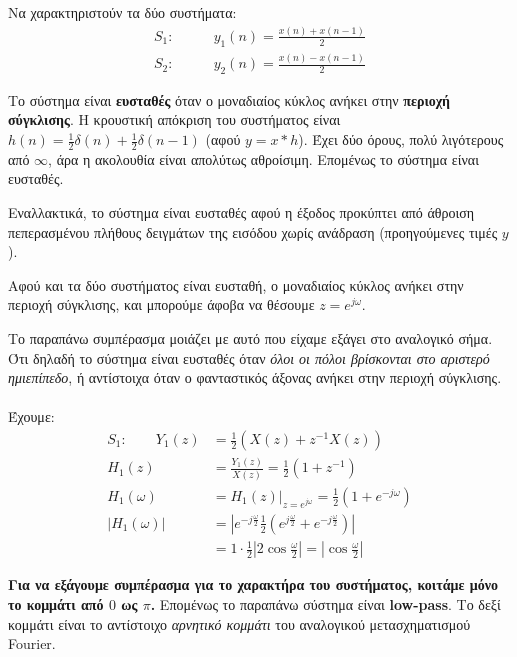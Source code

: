 \documentclass[11pt,a4paper,notitlepage,fleqn]{article}
\let\mytodo\todo
\renewcommand{\todo}[1]{\par\mytodo[inline,noline]{#1}}
\begin{document}
\begin{exercise}
	Να χαρακτηριστούν τα δύο συστήματα:
	\begin{align*}
		S_1: \qquad & y_1(n) = \frac{x(n) + x(n-1)}{2}\\
		S_2: \qquad & y_2(n) = \frac{x(n) - x(n-1)}{2}
	\end{align*}
	
	\tcblower
	Το σύστημα είναι \textbf{ευσταθές} όταν ο μοναδιαίος κύκλος ανήκει στην \textbf{περιοχή σύγκλισης}. Η κρουστική απόκριση
	του συστήματος είναι \( h(n) = \frac{1}{2}δ(n) + \frac{1}{2}δ(n-1) \) (αφού \( y=x*h \)). Έχει δύο
	όρους, πολύ λιγότερους από \( \infty \), άρα η ακολουθία είναι απολύτως αθροίσιμη. Επομένως το σύστημα είναι ευσταθές.
	
	Εναλλακτικά, το σύστημα είναι ευσταθές αφού η έξοδος προκύπτει από άθροιση πεπερασμένου πλήθους δειγμάτων της εισόδου χωρίς ανάδραση (προηγούμενες τιμές \( y \)).
	
	Αφού και τα δύο συστήματος είναι ευσταθή, ο μοναδιαίος κύκλος ανήκει στην περιοχή σύγκλισης, και
	μπορούμε άφοβα να θέσουμε \( z=e^{j\omega } \).
	
	Το παραπάνω συμπέρασμα μοιάζει με αυτό που είχαμε εξάγει στο αναλογικό σήμα. Ότι δηλαδή το σύστημα
	είναι ευσταθές όταν \emph{όλοι οι πόλοι βρίσκονται στο αριστερό ημιεπίπεδο}, ή αντίστοιχα όταν ο
	φανταστικός άξονας ανήκει στην περιοχή σύγκλισης.
	
	\paragraph{}
	
	Έχουμε:
	\begin{align*}
		S_1: \qquad Y_1(z) &= \frac{1}{2} \left( X(z) +z^{-1}X(z) \right)\\
		H_1(z) &= \frac{Y_1(z)}{X(z)} = \frac{1}{2}\left( 1+z^{-1} \right)\\
		H_1(\omega ) &= \left. H_1(z) \right|_{z=e^{j\omega }} = \frac{1}{2}\left( 1+e^{-j\omega } \right)
		\\
		\left|H_1(\omega )\right|&= \left|e^{-j\frac{\omega }{2}}\frac{1}{2}\left(
		e^{j\frac{\omega }{2}} + e^{-j\frac{\omega }{2}}
		\right)\right|
		\\ &= 1 \cdot \frac{1}{2} \left|
		2\cos\frac{\omega }{2}
		\right| = \left| \cos\frac{\omega }{2} \right|
	\end{align*}
	
	\todo{Graph 28}
	
	\textbf{Για να εξάγουμε συμπέρασμα για το χαρακτήρα του συστήματος, κοιτάμε μόνο το κομμάτι
	από \( 0 \) ως \( π \).} Επομένως το παραπάνω σύστημα είναι \textbf{low-pass}. Το δεξί κομμάτι
    είναι το αντίστοιχο \emph{αρνητικό κομμάτι} του αναλογικού μετασχηματισμού Fourier.
    

\end{exercise}
\end{document}
